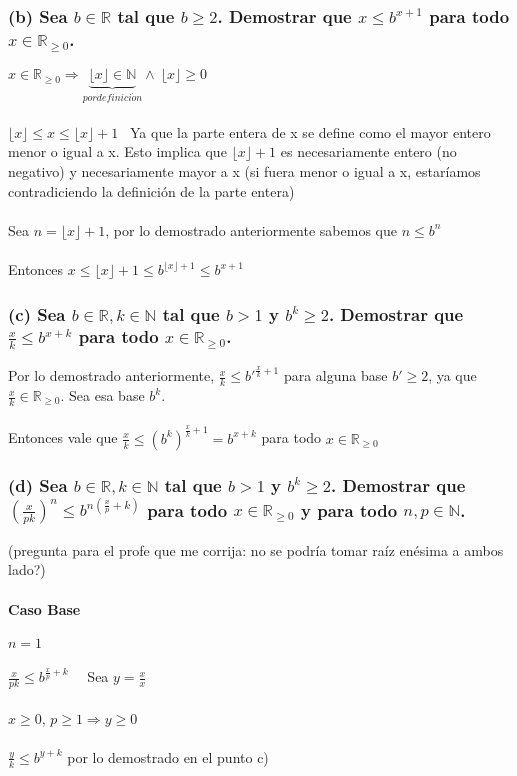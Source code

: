 \documentclass[10pt, a4paper]{article}
\begin{document}
\subsubsection*{(b) Sea $b \in \mathbb{R}$ tal que $b \ge 2$. Demostrar que $x\le b^{x+1}$ para todo $x\in \mathbb R_{\ge 0}$.}

$x\in \mathbb R_{\ge 0} \Rightarrow \underbrace{\lfloor x \rfloor \in \mathbb{N}}_{por definici\acute{o}n} \wedge  \ \lfloor x \rfloor \ge 0$ \\ \\
$\lfloor x \rfloor \le x \le \lfloor x \rfloor + 1$ \ Ya que la parte entera de x se define como el mayor entero menor o igual a x. Esto implica que $\lfloor x \rfloor + 1$ es necesariamente entero (no negativo) y necesariamente mayor a x (si fuera menor o igual a x, estaríamos contradiciendo la definición de la parte entera)\\ \\

Sea $n = \lfloor x \rfloor + 1$, por lo demostrado anteriormente sabemos que $n \le b^n$\\ \\
Entonces $x \le \lfloor x \rfloor + 1 \le b^{\lfloor x \rfloor + 1} \le b^{x + 1}$

\subsubsection*{(c) Sea $b \in \mathbb{R}, k \in \mathbb{N}$ tal que $b > 1$ y $b^k \ge 2$. Demostrar que $\frac{x}{k}\le b^{x+k}$ para todo $x\in \mathbb R_{\ge 0}$.}

Por lo demostrado anteriormente, $\frac{x}{k} \le b'^{\frac{x}{k} + 1}$ para alguna base $b' \ge 2$, ya que $\frac{x}{k} \in \mathbb R_{\ge 0}$. Sea esa base $b^k$.\\ \\
Entonces vale que $\frac{x}{k}\le (b^k)^{\frac{x}{k} + 1} = b^{x+k}$ para todo $x\in \mathbb R_{\ge 0}$

\subsubsection*{(d) Sea $b \in \mathbb{R}, k \in \mathbb{N}$ tal que $b > 1$ y $b^k \ge 2$. Demostrar que $(\frac{x}{pk})^n \le b^{n(\frac{x}{p} + k)}$ para todo $x\in \mathbb R_{\ge 0}$ y para todo $n, p \in \mathbb{N}$.}
(pregunta para el profe que me corrija: no se podría tomar raíz enésima a ambos lado?)

\paragraph*{Caso Base}
$n = 1$ \\ \\
$\frac{x}{pk} \le b^{\frac{x}{p} + k}$ \  \ Sea $y = \frac{x}{x}$\\ \\
$x \ge 0$, $p \ge 1 \Rightarrow y \ge 0$ \\ \\
$\frac{y}{k}\le b^{y+k}$ por lo demostrado en el punto c)
\end{document}
